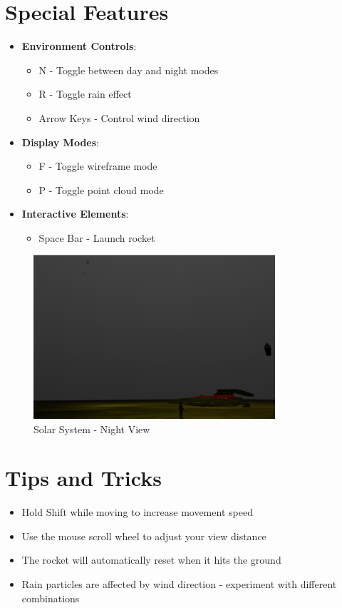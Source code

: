 \documentclass[12pt]{report}
\begin{document}
\section{Special Features}
\begin{itemize}
    \item \textbf{Environment Controls}:
        \begin{itemize}
            \item N - Toggle between day and night modes
            \item R - Toggle rain effect
            \item Arrow Keys - Control wind direction
        \end{itemize}
    \item \textbf{Display Modes}:
        \begin{itemize}
            \item F - Toggle wireframe mode
            \item P - Toggle point cloud mode
        \end{itemize}
    \item \textbf{Interactive Elements}:
        \begin{itemize}
            \item Space Bar - Launch rocket
        \end{itemize}
\end{itemize}

\begin{figure}[H]
\centering
\includegraphics[width=0.8\textwidth]{night.png}
\caption{Solar System - Night View}
\label{fig:night_view}
\end{figure}

\section{Tips and Tricks}
\begin{itemize}
    \item Hold Shift while moving to increase movement speed
    \item Use the mouse scroll wheel to adjust your view distance
    \item The rocket will automatically reset when it hits the ground
    \item Rain particles are affected by wind direction - experiment with different combinations
\end{itemize}
\end{document}
